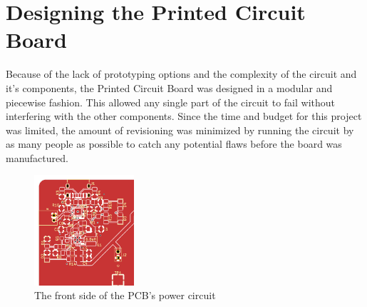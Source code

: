 \section{Designing the Printed Circuit Board}\label{sec:DesigningThePCB}

Because of the lack of prototyping options and the complexity of the circuit and it's components, the Printed Circuit Board was designed in a modular and piecewise fashion.
This allowed any single part of the circuit to fail without interfering with the other components.
Since the time and budget for this project was limited, the amount of revisioning was minimized by running the circuit by as many people as possible to catch any potential flaws before the board was manufactured.

\begin{figure}[b]
  \centering
  \includegraphics[width=0.33\textwidth]{Figures/kicad/close-ups/power-front}
  \caption[PCB Power Circuit]{The front side of the PCB's power circuit}
  \label{fig:PowerCircuit}
\end{figure}


